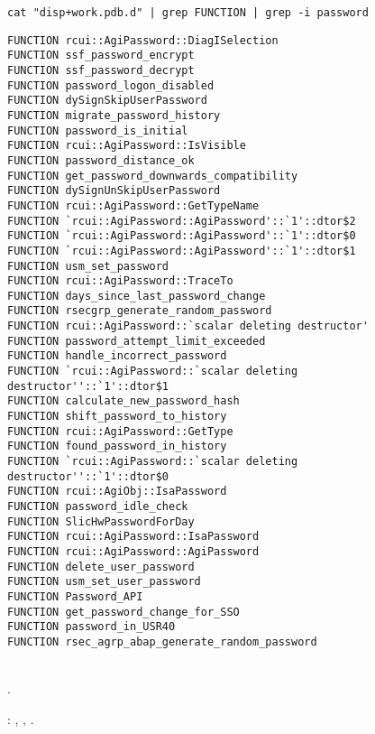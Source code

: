 \begin{lstlisting}
cat "disp+work.pdb.d" | grep FUNCTION | grep -i password
\end{lstlisting}


\begin{lstlisting}
FUNCTION rcui::AgiPassword::DiagISelection 
FUNCTION ssf_password_encrypt 
FUNCTION ssf_password_decrypt 
FUNCTION password_logon_disabled 
FUNCTION dySignSkipUserPassword 
FUNCTION migrate_password_history 
FUNCTION password_is_initial 
FUNCTION rcui::AgiPassword::IsVisible 
FUNCTION password_distance_ok 
FUNCTION get_password_downwards_compatibility 
FUNCTION dySignUnSkipUserPassword 
FUNCTION rcui::AgiPassword::GetTypeName 
FUNCTION `rcui::AgiPassword::AgiPassword'::`1'::dtor$2 
FUNCTION `rcui::AgiPassword::AgiPassword'::`1'::dtor$0 
FUNCTION `rcui::AgiPassword::AgiPassword'::`1'::dtor$1 
FUNCTION usm_set_password 
FUNCTION rcui::AgiPassword::TraceTo 
FUNCTION days_since_last_password_change 
FUNCTION rsecgrp_generate_random_password 
FUNCTION rcui::AgiPassword::`scalar deleting destructor' 
FUNCTION password_attempt_limit_exceeded 
FUNCTION handle_incorrect_password 
FUNCTION `rcui::AgiPassword::`scalar deleting destructor''::`1'::dtor$1 
FUNCTION calculate_new_password_hash 
FUNCTION shift_password_to_history 
FUNCTION rcui::AgiPassword::GetType 
FUNCTION found_password_in_history 
FUNCTION `rcui::AgiPassword::`scalar deleting destructor''::`1'::dtor$0 
FUNCTION rcui::AgiObj::IsaPassword 
FUNCTION password_idle_check 
FUNCTION SlicHwPasswordForDay 
FUNCTION rcui::AgiPassword::IsaPassword 
FUNCTION rcui::AgiPassword::AgiPassword 
FUNCTION delete_user_password 
FUNCTION usm_set_user_password 
FUNCTION Password_API 
FUNCTION get_password_change_for_SSO 
FUNCTION password_in_USR40 
FUNCTION rsec_agrp_abap_generate_random_password 
\end{lstlisting}

   \\
 .

: , , .

